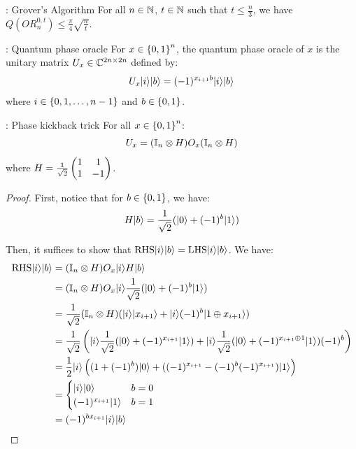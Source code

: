 \begin{propbox}{: Grover's Algorithm}
    For all $n \in \mathbb{N}$, $t \in \mathbb{N}$ such that $t \leq \frac{n}{3}$, we have $Q(OR_n^{0, t}) \leq \frac{\pi}{4}\sqrt{\frac{n}{t}}$. 
\end{propbox}

\begin{defbox}{: Quantum phase oracle}
    For $x \in \set{0, 1}^n$, the quantum phase oracle of $x$ is the unitary matrix $U_x \in \mathbb{C}^{2n \times 2n}$ defined by:
    \begin{equation}
        U_x\lvert i \rangle\lvert b \rangle = (-1)^{x_{i+1}b}\lvert i \rangle\lvert b \rangle
    \end{equation}
    where $i \in \set{0, 1, \ldots, n-1}$ and $b \in \set{0, 1}$. 
\end{defbox}

\begin{lembox}{: Phase kickback trick}
    For all $x \in \set{0, 1}^n$:
    \begin{equation}
        U_x = (\mathbb{I}_n \otimes H)O_x(\mathbb{I}_n \otimes H)
    \end{equation}
    where $H = \frac{1}{\sqrt{2}}\begin{pmatrix}1 & 1 \\ 1 & -1\end{pmatrix}$. 
\end{lembox}
\begin{proof}
    First, notice that for $b \in \set{0, 1}$, we have:
    \begin{equation}
        H\lvert b \rangle = \frac{1}{\sqrt{2}}(\lvert 0 \rangle + (-1)^b\lvert 1 \rangle)
    \end{equation}

    Then, it suffices to show that $\text{RHS}\lvert i \rangle\lvert b \rangle = \text{LHS}\lvert i \rangle\lvert b \rangle$. We have:
    \begin{align*}
        \text{RHS}\lvert i \rangle\lvert b \rangle &= (\mathbb{I}_n \otimes H)O_x\lvert i \rangle H\lvert b \rangle 
        \\ &= (\mathbb{I}_n \otimes H)O_x\lvert i \rangle\frac{1}{\sqrt{2}}(\lvert 0 \rangle + (-1)^b\lvert 1 \rangle)
        \\ &= \frac{1}{\sqrt{2}}(\mathbb{I}_n \otimes H)(\lvert i \rangle\lvert x_{i+1} \rangle + \lvert i \rangle(-1)^b\lvert 1 \oplus x_{i+1} \rangle)
        \\ &= \frac{1}{\sqrt{2}}\left(\lvert i \rangle\frac{1}{\sqrt{2}}(\lvert 0 \rangle + (-1)^{x_{i+1}}\lvert 1 \rangle) + \lvert i \rangle\frac{1}{\sqrt{2}}(\lvert 0 \rangle + (-1)^{x_{i+1} \oplus 1}\lvert 1 \rangle)(-1)^b\right)
        \\ &= \frac{1}{2}\lvert i \rangle\left((1 + (-1)^b)\lvert 0 \rangle + ((-1)^{x_{i+1}} - (-1)^b(-1)^{x_{i+1}})\lvert 1 \rangle\right)
        \\ &= \begin{cases}
            \lvert i \rangle\lvert 0 \rangle & b = 0
            \\ (-1)^{x_{i+1}}\lvert 1 \rangle & b = 1
        \end{cases}
        \\ &= (-1)^{bx_{i+1}}\lvert i \rangle\lvert b \rangle
    \end{align*}
\end{proof}


